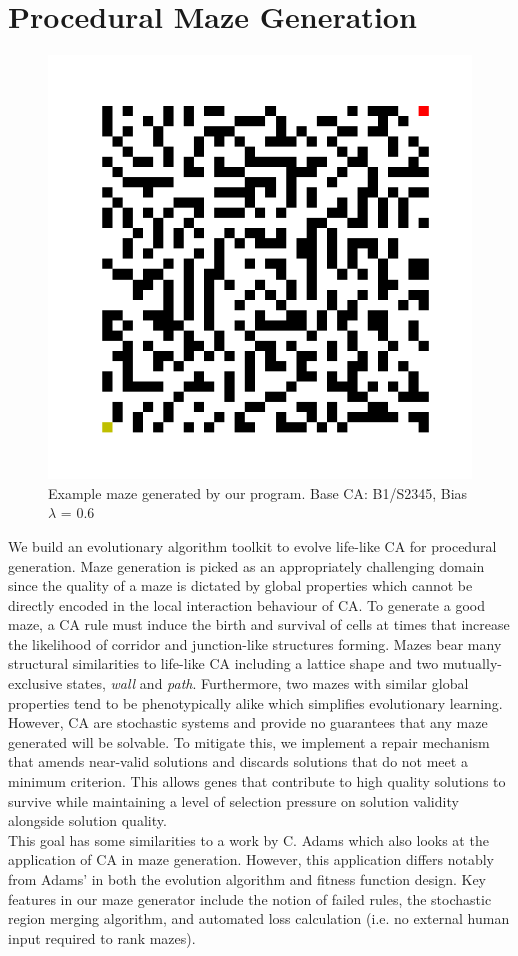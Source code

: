 \chapter{Procedural Maze Generation} \label{procedural}
\begin{figure}[!h]
\centering
    \includegraphics[width=.4\textwidth]{images/maze_example.png}
    \caption{Example maze generated by our program. Base CA: B1/S2345, Bias $\lambda$ = 0.6}
\label{fig:maze-example}
\end{figure}
We build an evolutionary algorithm toolkit to evolve life-like CA for procedural generation. Maze generation is picked as an appropriately challenging domain since the quality of a maze is dictated by global properties which cannot be directly encoded in the local interaction behaviour of CA. To generate a good maze, a CA rule must induce the birth and survival of cells at times that increase the likelihood of corridor and junction-like structures forming. Mazes bear many structural similarities to life-like CA including a lattice shape and two mutually-exclusive states, \textit{wall} and \textit{path}. Furthermore, two mazes with similar global properties tend to be phenotypically alike which simplifies evolutionary learning. However, CA are stochastic systems and provide no guarantees that any maze generated will be solvable. To mitigate this, we implement a repair mechanism that amends near-valid solutions and discards solutions that do not meet a minimum criterion. This allows genes that contribute to high quality solutions to survive while maintaining a level of selection pressure on solution validity alongside solution quality.\\

This goal has some similarities to a work by C. Adams\cite{adams2018evolving} which also looks at the application of CA in maze generation. However, this application differs notably from Adams' in both the evolution algorithm and fitness function design. Key features in our maze generator include the notion of failed rules, the stochastic region merging algorithm, and automated loss calculation (i.e. no external human input required to rank mazes).\\

